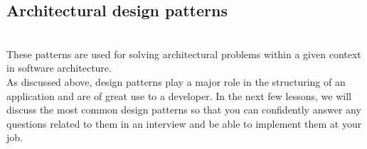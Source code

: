\subsection{Architectural design patterns}\label{architectural-design-patterns}
\\
These patterns are used for solving architectural problems within a given context in software architecture.
\\
As discussed above, design patterns play a major role in the structuring of an application and are of great use to a developer. In the next few lessons, we will discuss the most common design patterns so that you can confidently answer any questions related to them in an interview and be able to implement them at your job.

